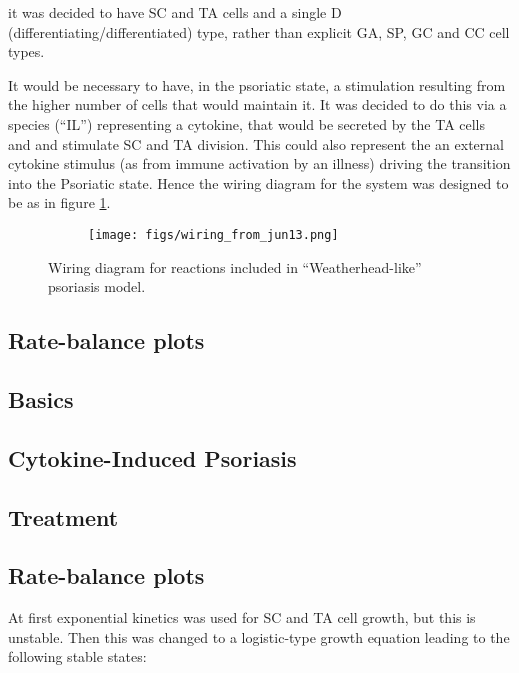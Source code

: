 \documentclass[a4paper,10pt]{report}
\begin{document}
it was decided to have SC and TA cells and a single D (differentiating/differentiated) type, rather than explicit GA, SP, GC and CC cell types.

It would be necessary to have, in the psoriatic state, a stimulation resulting from the higher number of cells that would maintain it. It was decided to do this via a species (``IL'') representing a cytokine, that would be secreted by the TA cells and and stimulate SC and TA division. This could also represent the an external cytokine stimulus (as from immune activation by an illness) driving the transition into the Psoriatic state. Hence the wiring diagram for the system was designed to be as in figure \ref{fig:sophie_wiring}.

\begin{figure}[h!]
  \begin{subfigure}{\textwidth}
    \texttt{[image: figs/wiring\_from\_jun13.png]}
  \end{subfigure}
  \caption{Wiring diagram for reactions included in ``Weatherhead-like'' psoriasis model.}
  \label{fig:sophie_wiring}
\end{figure}


\subsection{Rate-balance plots}
\subsection{Basics}
\subsection{Cytokine-Induced Psoriasis}
\subsection{Treatment}

\subsection{Rate-balance plots}

At first exponential kinetics was used for SC and TA cell growth, but this is unstable. Then this was changed to a logistic-type growth equation leading to the following stable states: 
\end{document}
